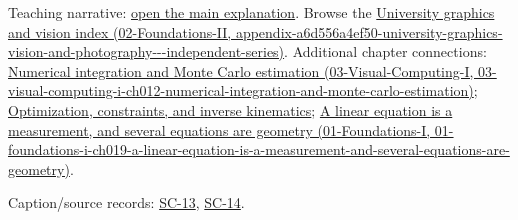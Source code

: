 Teaching narrative: \hyperref[04-visual-computing-ii-ch031-generative-models-learn-distributions-and-samplers]{open the main explanation}. Browse the \href{../02-Foundations-II/main.pdf\#nameddest=appendix-a6d556a4ef50-university-graphics-vision-and-photography---independent-series}{University graphics and vision index (02-Foundations-II, appendix-a6d556a4ef50-university-graphics-vision-and-photography-\/-\/-independent-series)}. Additional chapter connections: \href{../03-Visual-Computing-I/main.pdf\#nameddest=03-visual-computing-i-ch012-numerical-integration-and-monte-carlo-estimation}{Numerical integration and Monte Carlo estimation (03-Visual-Computing-I, 03-visual-computing-i-ch012-numerical-integration-and-monte-carlo-estimation)}; \hyperref[04-visual-computing-ii-ch029-optimization-constraints-and-inverse-kinematics]{Optimization, constraints, and inverse kinematics}; \href{../01-Foundations-I/main.pdf\#nameddest=01-foundations-i-ch019-a-linear-equation-is-a-measurement-and-several-equations-are-geometry}{A linear equation is a measurement, and several equations are geometry (01-Foundations-I, 01-foundations-i-ch019-a-linear-equation-is-a-measurement-and-several-equations-are-geometry)}.

Caption/source records: \hyperref[04-visual-computing-ii-ch036-sc-13---stanford-cs231n-deep-learning-for-computer-vision-spring-2025-lecture-13-generative-models-1]{SC-13}, \hyperref[04-visual-computing-ii-ch036-sc-14---stanford-cs231n-deep-learning-for-computer-vision-spring-2025-lecture-14-generative-models-2]{SC-14}.
